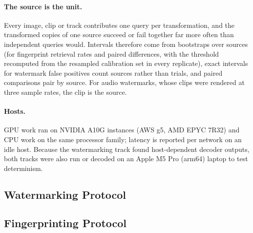 \paragraph{The source is the unit.} Every image, clip or track contributes one query per transformation, and the transformed copies of one source succeed or fail together far more often than independent queries would. Intervals therefore come from bootstraps over sources (for fingerprint retrieval rates and paired differences, with the threshold recomputed from the resampled calibration set in every replicate), exact intervals for watermark false positives count sources rather than trials, and paired comparisons pair by source. For audio watermarks, whose clips were rendered at three sample rates, the clip is the source.

\paragraph{Hosts.} GPU work ran on NVIDIA A10G instances (AWS g5, AMD EPYC 7R32) and CPU work on the same processor family; latency is reported per network on an idle host. Because the watermarking track found host-dependent decoder outputs, both tracks were also run or decoded on an Apple M5 Pro (arm64) laptop to test determinism.

\subsection{Watermarking Protocol}
\label{sec:wm-method}


\subsection{Fingerprinting Protocol}
\label{sec:fp-method}

